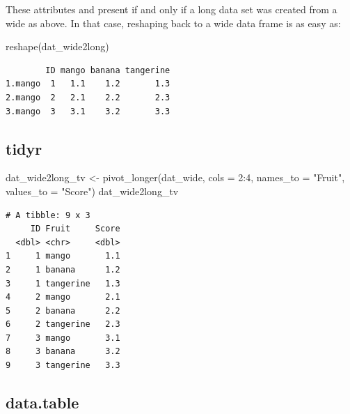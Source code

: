 \documentclass[
]{book}
\newenvironment{Shaded}{\begin{snugshade}}{\end{snugshade}}
\newcommand{\AttributeTok}[1]{\textcolor[rgb]{0.77,0.63,0.00}{#1}}
\newcommand{\DecValTok}[1]{\textcolor[rgb]{0.00,0.00,0.81}{#1}}
\newcommand{\FunctionTok}[1]{\textcolor[rgb]{0.00,0.00,0.00}{#1}}
\newcommand{\NormalTok}[1]{#1}
\newcommand{\OtherTok}[1]{\textcolor[rgb]{0.56,0.35,0.01}{#1}}
\newcommand{\SpecialCharTok}[1]{\textcolor[rgb]{0.00,0.00,0.00}{#1}}
\newcommand{\StringTok}[1]{\textcolor[rgb]{0.31,0.60,0.02}{#1}}
\begin{document}
These attributes and present if and only if a long data set was created from a wide as above. In that case, reshaping back to a wide data frame is as easy as:

\begin{Shaded}
\begin{Highlighting}[]
\FunctionTok{reshape}\NormalTok{(dat\_wide2long)}
\end{Highlighting}
\end{Shaded}

\begin{verbatim}
        ID mango banana tangerine
1.mango  1   1.1    1.2       1.3
2.mango  2   2.1    2.2       2.3
3.mango  3   3.1    3.2       3.3
\end{verbatim}

\hypertarget{tidyr}{%
\subsection{tidyr}\label{tidyr}}

\begin{Shaded}
\begin{Highlighting}[]
\NormalTok{dat\_wide2long\_tv }\OtherTok{\textless{}{-}} \FunctionTok{pivot\_longer}\NormalTok{(dat\_wide,}
                           \AttributeTok{cols =} \DecValTok{2}\SpecialCharTok{:}\DecValTok{4}\NormalTok{,}
                           \AttributeTok{names\_to =} \StringTok{"Fruit"}\NormalTok{,}
                           \AttributeTok{values\_to =} \StringTok{"Score"}\NormalTok{)}
\NormalTok{dat\_wide2long\_tv}
\end{Highlighting}
\end{Shaded}

\begin{verbatim}
# A tibble: 9 x 3
     ID Fruit     Score
  <dbl> <chr>     <dbl>
1     1 mango       1.1
2     1 banana      1.2
3     1 tangerine   1.3
4     2 mango       2.1
5     2 banana      2.2
6     2 tangerine   2.3
7     3 mango       3.1
8     3 banana      3.2
9     3 tangerine   3.3
\end{verbatim}

\hypertarget{data.table}{%
\subsection{data.table}\label{data.table}}
\end{document}
